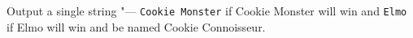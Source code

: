 Output a single string "--- \texttt{Cookie Monster} if Cookie Monster will win and \texttt{Elmo} if Elmo will win and be named Cookie Connoisseur.
